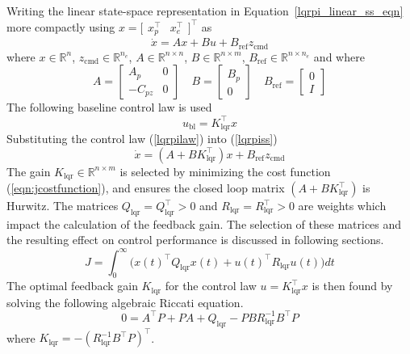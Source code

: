 Writing the linear state-space representation in Equation~\ref{lqrpi_linear_ss_eqn} more compactly using $x=\bigr[\begin{array}{cc} x_{p}^{\top} & x_{e}^{\top} \end{array}\bigr]^{\top}$ as
\begin{equation}
  \label{lqrpiss}
  \dot{x}=Ax+Bu+B_{\text{ref}}z_{\text{cmd}}
\end{equation}
where $x\in\mathbb{R}^{n}$, $z_{\text{cmd}}\in\mathbb{R}^{n_{e}}$, $A\in\mathbb{R}^{n\times n}$, $B\in\mathbb{R}^{n\times m}$, $B_{\text{ref}}\in\mathbb{R}^{n\times n_{e}}$ and where
\begin{equation}
  A=
  \begin{bmatrix}
    A_{p} & 0 \\
    -C_{pz} & 0
  \end{bmatrix} \quad
  B=
  \begin{bmatrix}
    B_{p} \\
    0
  \end{bmatrix}
  \quad
  B_{\text{ref}}=
  \begin{bmatrix}
    0 \\
    I
  \end{bmatrix}
\end{equation}
The following baseline control law is used
\begin{equation}
  \label{lqrpilaw}
  u_{\text{bl}}=K_{\text{lqr}}^{\top}x
\end{equation}
Substituting the control law (\ref{lqrpilaw}) into (\ref{lqrpiss})
\begin{equation}
  \label{eqn:nomaugmentedss}
  \dot{x}=\left(A+BK_{\text{lqr}}^{\top}\right)x+B_{\text{ref}}z_{\text{cmd}}
\end{equation}
The gain $K_{\text{lqr}}\in\mathbb{R}^{n\times m}$ is selected by minimizing the cost function (\ref{eqn:jcostfunction}), and ensures the closed loop matrix $\left(A+BK_{\text{lqr}}^{\top}\right)$ is Hurwitz.
The matrices $Q_{\text{lqr}}=Q_{\text{lqr}}^{\top}>0$ and $R_{\text{lqr}}=R_{\text{lqr}}^{\top}>0$ are weights which impact the calculation of the feedback gain.
The selection of these matrices and the resulting effect on control performance is discussed in following sections.
\begin{equation}
  \label{eqn:jcostfunction}
  J=\int_{0}^{\infty}\bigr(x(t)^{\top}Q_{\text{lqr}}x(t)+u(t)^{\top}R_{\text{lqr}}u(t)\bigr)dt
\end{equation}
The optimal feedback gain $K_{\text{lqr}}$ for the control law $u=K_{\text{lqr}}^{\top}x$ is then found by solving the following algebraic Riccati equation.
\begin{equation}
  0=A^{\top}P+PA+Q_{\text{lqr}}-PBR_{\text{lqr}}^{-1}B^{\top}P
\end{equation}
where $K_{\text{lqr}}=-(R_{\text{lqr}}^{-1}B^{\top}P)^{\top}$.

